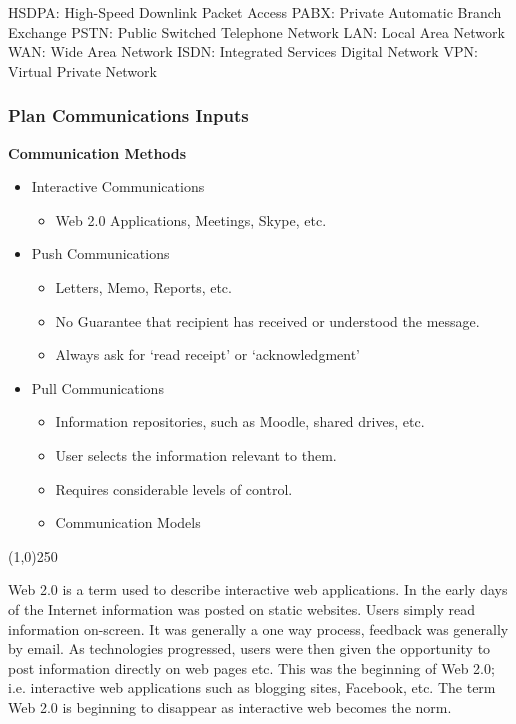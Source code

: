 HSDPA: High-Speed Downlink Packet Access 
PABX: Private Automatic Branch Exchange
PSTN: Public Switched Telephone Network
LAN: Local Area Network
WAN: Wide Area Network
ISDN: Integrated Services Digital Network
VPN: Virtual Private Network



\begin{frame}
\frametitle{Plan Communications \hfill\hfill Inputs}
\textbf{Communication Methods}
\begin{itemize}
	\item Interactive Communications
		\begin{itemize}
			\item Web 2.0 Applications, Meetings, Skype, etc. 
		\end{itemize}
	\item Push Communications
		\begin{itemize}
			\item Letters, Memo, Reports, etc.
			\item No Guarantee that recipient has received or understood the message.
			\item Always ask for `read receipt' or `acknowledgment'
		\end{itemize}
	\item Pull Communications
		\begin{itemize}
			\item Information repositories, such as Moodle, shared drives, etc.
			\item User selects the information relevant to them.
			\item Requires considerable levels of control.
			\item Communication Models
		\end{itemize}
\end{itemize}
\end{frame}\begin{center}\line(1,0){250}\end{center}

Web 2.0 is a term used to describe interactive web applications.  In the early days of the Internet information was posted on static websites.  Users simply read information on-screen.  It was generally a one way process, feedback was generally by email.  As technologies progressed, users were then given the opportunity to post information directly on web pages etc.  This was the beginning of Web 2.0; i.e. interactive web applications such as blogging sites, Facebook, etc.  The term Web 2.0 is beginning to disappear as interactive web becomes the norm.



